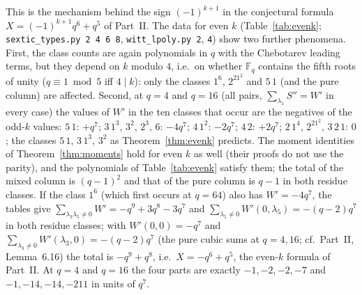 ﻿\documentclass[12pt,a4paper]{amsart}
\theoremstyle{definition}
\newcommand{\F}{\mathbb{F}}
\newcommand{\Spp}{S''}
\begin{document}
This is the mechanism behind the sign $(-1)^{k+1}$ in the conjectural formula $X=(-1)^{k+1}q^6+q^5$ of Part~II. The data for even $k$ (Table~\ref{tab:evenk}; \texttt{sextic\_types.py 2 4 6 8}, \texttt{witt\_lpoly.py 2}, \texttt{4}) show two further phenomena. First, the class counts are again polynomials in $q$ with the Chebotarev leading terms, but they depend on $k$ modulo $4$, i.e.\ on whether $\F_q$ contains the fifth roots of unity ($q\equiv1\bmod5$ iff $4\mid k$): only the classes $1^6$, $2^21^2$ and $5\,1$ (and the pure column) are affected. Second, at $q=4$ and $q=16$ (all pairs, $\sum_{\lambda_1}\Spp=W'$ in every case) the values of $W'$ in the ten classes that occur are the negatives of the odd-$k$ values: $5\,1$: $+q^7$; $3\,1^3$, $3^2$, $2^3$, $6$: $-4q^7$; $4\,1^2$: $-2q^7$; $4\,2$: $+2q^7$; $2\,1^4$, $2^21^2$, $3\,2\,1$: $0$; the classes $5\,1$, $3\,1^3$, $3^2$ as Theorem~\ref{thm:evenk} predicts. The moment identities of Theorem~\ref{thm:moments} hold for even $k$ as well (their proofs do not use the parity), and the polynomials of Table~\ref{tab:evenk} satisfy them; the total of the mixed column is $(q-1)^2$ and that of the pure column is $q-1$ in both residue classes. If the class $1^6$ (which first occurs at $q=64$) also has $W'=-4q^7$, the tables give $\sum_{\lambda_3\lambda_5\ne0}W'=-q^9+3q^8-3q^7$ and $\sum_{\lambda_5\ne0}W'(0,\lambda_5)=-(q-2)q^7$ in both residue classes; with $W'(0,0)=-q^7$ and $\sum_{\lambda_3\ne0}W'(\lambda_3,0)=-(q-2)q^7$ (the pure cubic sums at $q=4,16$; cf.\ Part~II, Lemma~6.16) the total is $-q^9+q^8$, i.e.\ $X=-q^6+q^5$, the even-$k$ formula of Part~II. At $q=4$ and $q=16$ the four parts are exactly $-1,-2,-2,-7$ and $-1,-14,-14,-211$ in units of $q^7$.
\end{document}
